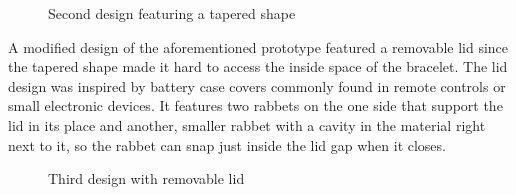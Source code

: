 \begin{figure}[bth]
	\myfloatalign
	 \quad
	\caption{Second design featuring a tapered shape}
\end{figure}

A modified design of the aforementioned prototype featured a removable lid since the tapered shape made it hard to access the inside space of the bracelet. The lid design was inspired by battery case covers commonly found in remote controls or small electronic devices. It features two rabbets on the one side that support the lid in its place and another, smaller rabbet with a cavity in the material right next to it, so the rabbet can snap just inside the lid gap when it closes.

\begin{figure}[bth]
	\myfloatalign
	 \quad
	\caption{Third design with removable lid}
\end{figure}

